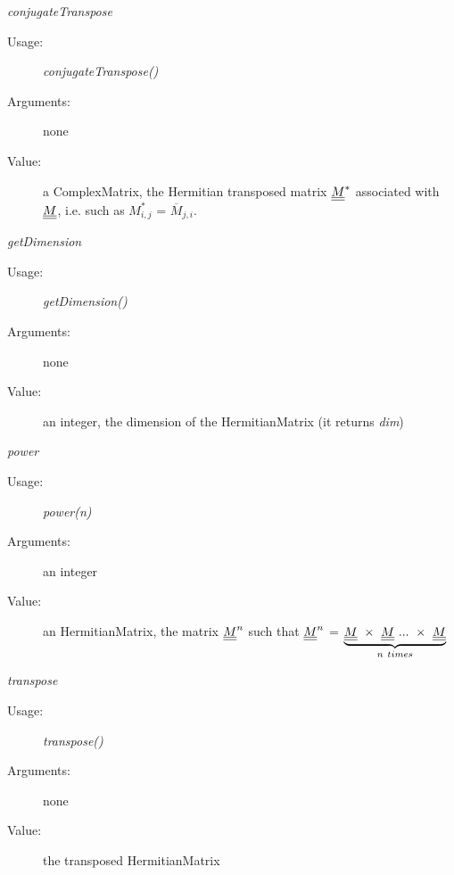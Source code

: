 \begin{description}
\item \textit{conjugateTranspose}
\begin{description}
\item[Usage:] \textit{conjugateTranspose()}
\item[Arguments:] none
\item[Value:] a ComplexMatrix, the Hermitian transposed matrix ${\underline{\underline{M}}}^*$ associated with ${\underline{\underline{M}}}$, i.e. such as $M^*_{i,j}$ = $\overline{M}_{j,i}$.
\end{description}
\bigskip

\item \textit{getDimension}
\begin{description}
\item[Usage:] \textit{getDimension()}
\item[Arguments:] none
\item[Value:] an integer, the dimension of the HermitianMatrix (it returns \textit{dim})
\end{description}
\bigskip

\item \textit{power}
\begin{description}
\item[Usage:] \textit{power(n)}
\item[Arguments:] an integer
\item[Value:] an HermitianMatrix, the matrix ${\underline{\underline{M}}}^n$ such that ${\underline{\underline{M}}}^n$  = $\underbrace{\mat{M} \ \times \ \mat{M} \ ...\ \times \ \mat{M}}_{n\ times}$
\end{description}
\bigskip

\item \textit{transpose}
\begin{description}
\item[Usage:] \textit{transpose()}
\item[Arguments:] none
\item[Value:] the transposed HermitianMatrix
\end{description}
\bigskip

\end{description}




\newpage
